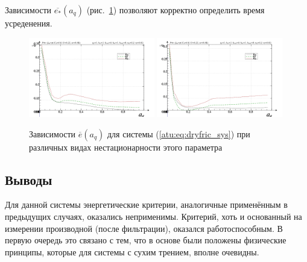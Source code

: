 Зависимости $\overline{e_*}(a_q)$ (рис.~\ref{atu:f:fric_e_a_q})
 позволяют корректно определить время усреденения.

\begin{figure}[htb!]
\centerline{
  \includegraphics[width=0.49\textwidth]{p/cha/fric/fric_m5p-p_a_q_e_sign.png}
  \includegraphics[width=0.49\textwidth]{p/cha/fric/fric_m5p-p_a_q_e_sin.png}
}
  \caption{Зависимости  $\overline{e}(a_q)$ для системы (\ref{atu:eq:dryfric_sys})
  при различных видах нестационарности этого параметра
}
\label{atu:f:fric_e_a_q}
\end{figure}


\subsection{Выводы}  %

Для данной системы энергетические критерии, аналогичные применённым в предыдущих случаях,
оказались неприменимы. Критерий, хоть и основанный на измерении производной (после фильтрации),
оказался работоспособным. В первую очередь это связано с тем, что в основе были положены
физические принципы, которые для системы с сухим трением, вполне очевидны.





